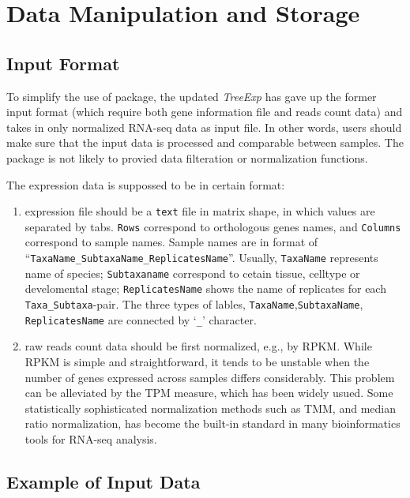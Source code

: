 \documentclass[]{book}
\begin{document}
\hypertarget{data-manipulation-and-storage}{%
\chapter{Data Manipulation and Storage}\label{data-manipulation-and-storage}}

\hypertarget{input-format}{%
\section{Input Format}\label{input-format}}

To simplify the use of package, the updated \emph{TreeExp} has gave up the former input format (which require both gene information file and reads count data) and takes in only normalized RNA-seq data as input file. In other words, users should make sure that the input data is processed and comparable between samples. The package is not likely to provied data filteration or normalization functions.

The expression data is suppossed to be in certain format:

\begin{enumerate}
\def\labelenumi{\arabic{enumi}.}
\item
  expression file should be a \texttt{text} file in matrix shape, in which values are separated by tabs. \texttt{Rows} correspond to orthologous genes names, and \texttt{Columns} correspond to sample names. Sample names are in format of ``\texttt{TaxaName\_SubtaxaName\_ReplicatesName}''. Usually, \texttt{TaxaName} represents name of species; \texttt{Subtaxaname} correspond to cetain tissue, celltype or develomental stage; \texttt{ReplicatesName} shows the name of replicates for each \texttt{Taxa\_Subtaxa}-pair. The three types of lables, \texttt{TaxaName},\texttt{SubtaxaName}, \texttt{ReplicatesName} are connected by `\texttt{\_}' character.
\item
  raw reads count data should be first normalized, e.g., by RPKM. While RPKM is simple and straightforward, it tends to be unstable when the number of genes expressed across samples differs considerably. This problem can be alleviated by the TPM measure, which has been widely usued. Some statistically sophisticated normalization methods such as TMM, and median ratio normalization, has become the built-in standard in many bioinformatics tools for RNA-seq analysis\citep{robinson2010}.
\end{enumerate}

\hypertarget{example-of-input-data}{%
\section{Example of Input Data}\label{example-of-input-data}}
\end{document}
